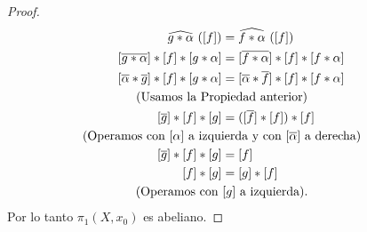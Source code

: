 \begin{proof}
   \begin{align*}
   \widehat{g*\alpha}\,\left([f]\right) &= \widehat{f*\alpha}\,\left([f]\right)\\
   [\overline{g*\alpha}]*[f]*[g*\alpha] &= [\overline{f*\alpha}]*[f]*[f*\alpha]\\
   [\overline{\alpha}*\overline{g}]*[f]*[g*\alpha] &= [\overline{\alpha}*\overline{f}]*[f]*[f*\alpha]\\
   & \mathclap{\text{(Usamos la Propiedad anterior)}}\\
   [\overline{g}]*[f]*[g] &= ([\overline{f}]*[f])*[f]\\
   & \mathclap{\text{(Operamos con } [\alpha] \text{ a izquierda y con } [\overline{\alpha}] \text{ a derecha)}}\\
   [\overline{g}]*[f]*[g] &= [f]\\
   [f]*[g] &= [g]*[f]\\
   & \mathclap{\text{(Operamos con } [g] \text{ a izquierda).}}
   \end{align*}
   Por lo tanto $\pi_1(X,x_0)$ es abeliano.
\end{proof}
